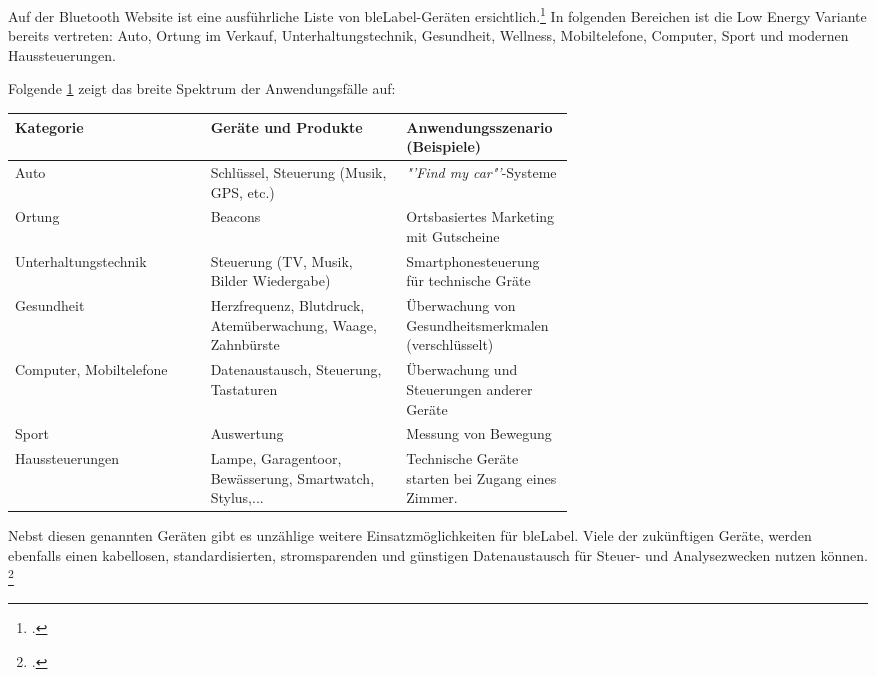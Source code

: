 Auf der Bluetooth Website ist eine ausführliche Liste von \gls{bleLabel}-Geräten ersichtlich.\footcite{Bluetooth_Smart_Devices_List_Bluetooth_Technology_Website_2015-05-14}
In folgenden Bereichen ist die Low Energy Variante bereits vertreten: Auto, Ortung im Verkauf, Unterhaltungstechnik, Gesundheit, Wellness, Mobiltelefone, Computer, Sport und modernen Haussteuerungen.

Folgende \cref{tab:usecases} zeigt das breite Spektrum der Anwendungsfälle auf:
\begin{table}[H]
	\small\sffamily\renewcommand{\arraystretch}{1.4}
	\label{tab:usecases}
	\begin{tabular}{lp{0.35\linewidth}p{0.30\linewidth}}
		\toprule
		Kategorie & Geräte und Produkte & Anwendungsszenario (Beispiele)\\
		\midrule
		Auto & Schlüssel, Steuerung (Musik, GPS, etc.) & \textit{"'Find my car"'}-Systeme\\
		Ortung & Beacons & Ortsbasiertes Marketing mit Gutscheine\\
		Unterhaltungstechnik & Steuerung (TV, Musik, Bilder Wiedergabe) & Smartphonesteuerung für technische Gräte\\
		Gesundheit & Herzfrequenz, Blutdruck, Atemüberwachung, Waage, Zahnbürste & Überwachung von Gesundheitsmerkmalen (verschlüsselt)\\
		Computer, Mobiltelefone & Datenaustausch, Steuerung, Tastaturen & Überwachung und Steuerungen anderer Geräte\\
		Sport & Auswertung & Messung von Bewegung\\
		Haussteuerungen & Lampe, Garagentoor, Bewässerung, Smartwatch, Stylus,... & Technische Geräte starten bei Zugang eines Zimmer.\\
		\bottomrule
	\end{tabular}
\end{table}

Nebst diesen genannten Geräten gibt es unzählige weitere Einsatzmöglichkeiten für \gls{bleLabel}.
Viele der zukünftigen Geräte, werden ebenfalls einen kabellosen, standardisierten, stromsparenden und günstigen Datenaustausch für Steuer- und Analysezwecken nutzen können.
\footcite[][3,5]{ti_whitepaper_2015-05-08}





